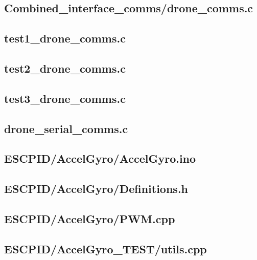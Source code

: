 \documentclass[a4paper,11pt]{article}
\begin{document}
   \subsection{Combined\_interface\_comms/drone\_comms.c}
 
   \subsection{test1\_drone\_comms.c}
 
    \subsection{test2\_drone\_comms.c}
 
    \subsection{test3\_drone\_comms.c}
 
 \subsection{drone\_serial\_comms.c}
 
\subsection{ESCPID/AccelGyro/AccelGyro.ino}

\subsection{ESCPID/AccelGyro/Definitions.h}

\subsection{ESCPID/AccelGyro/PWM.cpp}

\subsection{ESCPID/AccelGyro\_TEST/utils.cpp}

\end{document}
